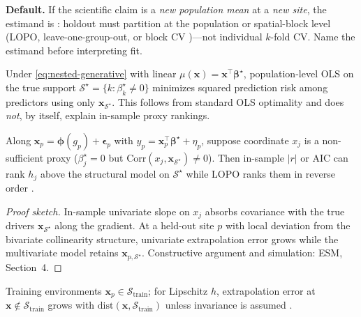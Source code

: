 \documentclass[11pt]{article}
\begin{document}
\begin{corollary}
\label{cor:operational-default}
\textbf{Default.}  If the scientific claim is a \emph{new population mean} at
a \emph{new site}, the estimand is \Etwo: holdout must partition at the
population or spatial-block level (LOPO, leave-one-group-out, or block CV
\citep{roberts2017})---not individual $k$-fold CV.  Name the estimand
before interpreting fit.
\end{corollary}

\begin{lemma}
\label{lem:oracle}
Under \eqref{eq:nested-generative} with linear $\mu(\mathbf{x})=
\mathbf{x}^\top\boldsymbol{\beta}^\star$, population-level OLS on the
true support $\mathcal{S}^\star=\{k:\beta_k^\star\neq 0\}$ minimizes
squared prediction risk among predictors using only
$\mathbf{x}_{\mathcal{S}^\star}$.  This follows from standard OLS
optimality \citep{hastie2009} and does \emph{not}, by itself, explain
in-sample proxy rankings.
\end{lemma}

\begin{theorem}
\label{thm:rank-reversal}
Along $\mathbf{x}_p = \boldsymbol{\phi}(g_p)+\boldsymbol{\epsilon}_p$ with
$y_p = \mathbf{x}_p^\top\boldsymbol{\beta}^\star+\eta_p$, suppose coordinate
$x_j$ is a non-sufficient proxy ($\beta_j^\star=0$ but
$\mathrm{Corr}(x_j,\mathbf{x}_{\mathcal{S}^\star})\neq 0$).  Then
in-sample $|r|$ or AIC can rank $h_j$ above the structural model on
$\mathcal{S}^\star$ while LOPO ranks them in reverse order
\citep{burnham2002,geirhos2020,dormann2013}.
\end{theorem}

\begin{proof}[Proof sketch]
In-sample univariate slope on $x_j$ absorbs covariance with the true drivers
$\mathbf{x}_{\mathcal{S}^\star}$ along the gradient.  At a held-out site $p$
with local deviation from the bivariate collinearity structure, univariate
extrapolation error grows while the multivariate model retains
$\mathbf{x}_{p,\mathcal{S}^\star}$.  Constructive argument and simulation:
ESM, Section~4.
\end{proof}

\begin{proposition}
\label{prop:support}
Training environments $\mathbf{x}_p\in\mathcal{S}_{\mathrm{train}}$;
for Lipschitz $h$, extrapolation error at
$\mathbf{x}\notin\mathcal{S}_{\mathrm{train}}$ grows with
$\mathrm{dist}(\mathbf{x},\mathcal{S}_{\mathrm{train}})$ unless invariance
is assumed \citep{grinnell1917,ploton2020,araujo2019}.
\end{proposition}
\end{document}
